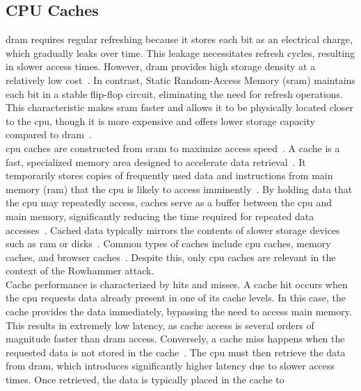   \subsection{CPU Caches} \label{subsec:-caches}
    \gls{dram} requires regular refreshing because it stores each bit 
    as an electrical charge, which gradually leaks over time. This leakage necessitates refresh 
    cycles, resulting in slower access times. However, \gls{dram} provides high storage density at a 
    relatively low cost~\cite{webCache}. In contrast, Static Random-Access Memory (\gls{sram}) maintains each bit 
    in a stable flip-flop circuit, eliminating the need for refresh operations. This 
    characteristic makes \gls{sram} faster and allows it to be physically located closer to the \gls{cpu}, 
    though it is more expensive and offers lower storage capacity compared to \gls{dram}~\cite{webCache}. \\
    \gls{cpu} caches are constructed from \gls{sram} to maximize access speed~\cite{webCPUCache, paperOverviewOfCacheMemory}. A cache is a fast, 
    specialized memory area designed to accelerate data retrieval~\cite{webCache}. It temporarily stores 
    copies of frequently used data and instructions from main memory (\gls{ram}) that the \gls{cpu} is likely 
    to access imminently~\cite{webCache, webCPUCache}. By holding data that the \gls{cpu} may repeatedly access, caches 
    serve as a buffer between the \gls{cpu} and main memory, significantly reducing the time required 
    for repeated data accesses~\cite{webWhatsACache-1, webCPUCache}. Cached data typically mirrors the contents of slower 
    storage devices such as \gls{ram} or disks~\cite{webCache}. Common types of caches include \gls{cpu} caches, memory 
    caches, and browser caches~\cite{webCache}. Despite this, only \gls{cpu} caches are relevant in the context of the 
    Rowhammer attack. \\
    Cache performance is characterized by hits and misses. A cache hit occurs when the \gls{cpu} 
    requests data already present in one of its cache levels. In this case, the cache provides 
    the data immediately, bypassing the need to access main memory. This results in extremely 
    low latency, as cache access is several orders of magnitude faster than \gls{dram} access. 
    Conversely, a cache miss happens when the requested data is not stored in the cache~\cite{paperOverviewOfCacheMemory}. The 
    \gls{cpu} must then retrieve the data from \gls{dram}, which introduces significantly higher latency 
    due to slower access times. Once retrieved, the data is typically placed in the cache to 
